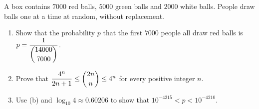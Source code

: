 A box contains $7000$ red balls, $5000$ green balls and $2000$ white balls. People draw balls one at a time at random, without replacement.
\begin{enumerate}
\item[(a)] Show that the probability $p$ that the first $7000$ people all draw red balls is $p=\dfrac{1}{\dbinom{14000}{7000}}$.
\item[(b)] Prove that $\dfrac{4^n}{2n+1}\le\dbinom{2n}{n}\le4^n$ for every positive integer $n$.
\item[(c)] Use (b) and $\log_{10}4\approx0.60206$ to show that $10^{-4215}<p<10^{-4210}$.
\end{enumerate}
